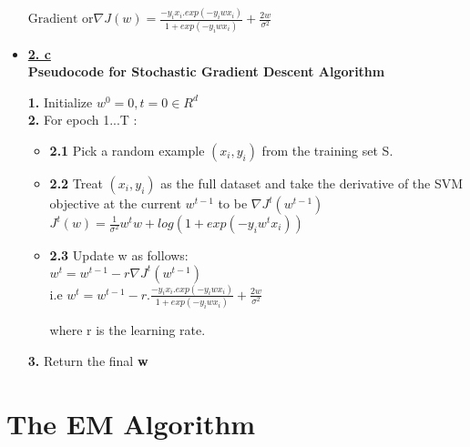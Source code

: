 \documentclass[11pt]{article}
\begin{document}
\begin{itemize}
	$\boxed{ \text{Gradient or} \nabla J(w) =\frac{-y_ix_i. exp(-y_iwx_i)}{1 + exp(-y_iwx_i)}  + \frac{2w}{\sigma^2} }$\\
	
	\item[] \textbf{\underline{2. c}}\\
	
	\textbf{ Pseudocode for Stochastic Gradient Descent Algorithm}
	
	\textbf{1.} Initialize $w^0= 0, t=0 \in  R^d$\\
	\textbf{2.} For epoch 1...T :
		\begin{itemize}
			\item[] \textbf{2.1} Pick a random example $(x_i,y_i)$ from the training set S.
			\item[] \textbf{2.2} Treat $(x_i,y_i)$ as the full dataset and take the derivative of the SVM objective at the current $w^{t-1}$ to be $\nabla J^t(w^{t-1})$\\
			$J^t(w) = \frac{1}{\sigma^2} w^t w + log(1+ exp (-y_iw^tx_i))$
			
			\item[] \textbf{2.3} Update w as follows:\\
			$w^t= w^{t-1} - r \nabla J^t(w^{t-1})$ \\
			i.e $\boxed{w^t =w^{t-1} -r . \frac{-y_ix_i. exp(-y_iwx_i)}{1 + exp(-y_iwx_i)}  + \frac{2w}{\sigma^2}}$
			
			where r is the learning rate.
			
		\end{itemize}
	\textbf{3.} Return the final \textbf{w}

\end{itemize}
	
\section{ The EM Algorithm}
\end{document}
